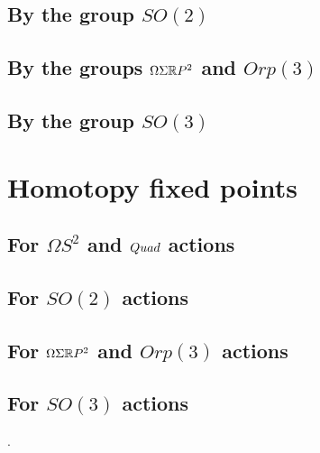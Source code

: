 \documentclass{amsart}
\begin{document}
\subsection{By the group $SO(2)$}


\subsection{By the groups $\Omega \Sigma \mathbb R P^2$ and $Orp(3)$}


\subsection{By the group $SO(3)$}


\section{Homotopy fixed points}



\subsection{For $\Omega S^2$ and $Quad$ actions}


\subsection{For $SO(2)$ actions}


\subsection{For $\Omega \Sigma \mathbb R P^2$ and $Orp(3)$ actions}


\subsection{For $SO(3)$ actions}

.
\end{document}
